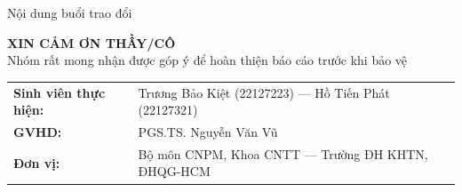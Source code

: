 




\begin{frame}[plain]
  \titlepage
\end{frame}

\begin{frame}{Nội dung buổi trao đổi}
  \small
  \tableofcontents
\end{frame}







\begin{frame}[plain]
  \centering
  \vfill
  {\color{structure.fg}\Large\textbf{XIN CẢM ƠN THẦY/CÔ}}\\[0.3cm]
  {\normalsize Nhóm rất mong nhận được góp ý để hoàn thiện báo cáo trước khi bảo vệ}
  \vfill
  \footnotesize
  \begin{tabular}{ll}
    \textbf{Sinh viên thực hiện:} & Trương Bảo Kiệt (22127223) --- Hồ Tiến Phát (22127321) \\
    \textbf{GVHD:} & PGS.TS. Nguyễn Văn Vũ \\
    \textbf{Đơn vị:} & Bộ môn CNPM, Khoa CNTT --- Trường ĐH KHTN, ĐHQG-HCM
  \end{tabular}
  \vfill
\end{frame}


